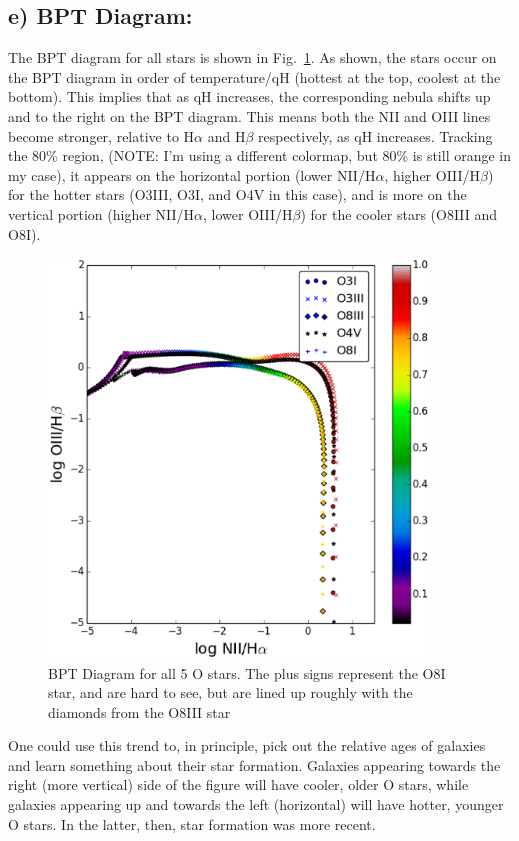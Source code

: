 \documentclass[a4paper]{article}
\begin{document}
\subsection{e) BPT Diagram:}
The BPT diagram for all stars is shown in Fig.~\ref{fig:BPT}. As shown, the stars
occur on the BPT diagram in order of temperature/qH (hottest at the top, coolest
at the bottom). This implies that as qH increases, the corresponding nebula
shifts up and to the right on the BPT diagram. This means both the NII and 
OIII lines become stronger, relative to H$\alpha$ and H$\beta$ respectively,
as qH increases. Tracking the 80\% region,
(NOTE: I'm using a different colormap, but 80\% is still orange in my case),
it appears on the horizontal portion (lower NII/H$\alpha$, higher OIII/H$\beta$)
for the hotter stars (O3III, O3I, and O4V in this case), and is more on the 
vertical portion (higher NII/H$\alpha$, lower OIII/H$\beta$) for the cooler
stars (O8III and O8I).

\begin{figure}
\centering
\includegraphics[width=0.9\textwidth]{./figures/BPTDiagram_all_stars.eps}
\caption{BPT Diagram for all 5 O stars. The plus signs represent the O8I star,
and are hard to see, but are lined up roughly with the diamonds from the O8III
star}
\label{fig:BPT}
\end{figure}

One could use this trend to, in principle, pick out the relative ages of galaxies
and learn something about their star formation. Galaxies appearing towards the
right (more vertical) side of the figure will have cooler, older O stars, while
galaxies appearing up and towards the left (horizontal) will have hotter,
younger O stars. In the latter, then, star formation was more recent.
\end{document}
